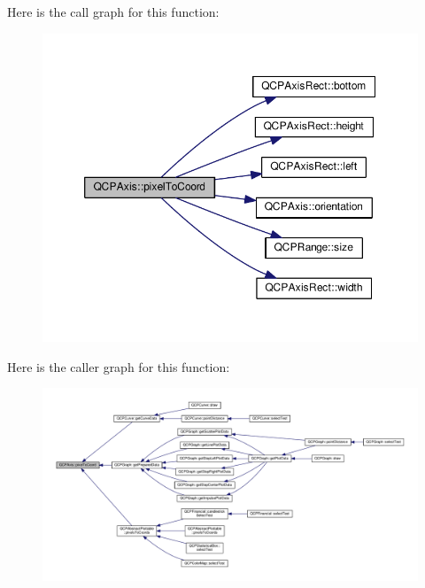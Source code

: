 Here is the call graph for this function\+:\nopagebreak
\begin{figure}[H]
\begin{center}
\leavevmode
\includegraphics[width=350pt]{class_q_c_p_axis_ae9289ef7043b9d966af88eaa95b037d1_cgraph}
\end{center}
\end{figure}




Here is the caller graph for this function\+:\nopagebreak
\begin{figure}[H]
\begin{center}
\leavevmode
\includegraphics[width=350pt]{class_q_c_p_axis_ae9289ef7043b9d966af88eaa95b037d1_icgraph}
\end{center}
\end{figure}


\hypertarget{class_q_c_p_axis_a4f7404494cccdbfc00e1e865b7ed16a4}{}
